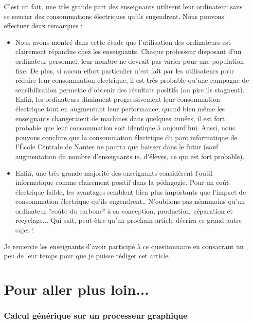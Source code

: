 \documentclass[a4paper,11pt,french]{article}
\begin{document}
C'est un fait, une très grande part des enseignants utilisent leur ordinateur sans se soucier des consommations électriques qu'ils engendrent. Nous pouvons effectuer deux remarques :\\
\begin{itemize}
\item Nous avons montré dans cette étude que l'utilisation des ordinateurs est clairement répandue chez les enseignants. Chaque professeur disposant d'un ordinateur personnel, leur nombre ne devrait pas varier pour une population fixe. De plus, si aucun effort particulier n'est fait par les utilisateurs pour réduire leur consommation électrique, il est très probable qu'une campagne de sensibilisation permette d'obtenir des résultats positifs (au pire ils stagnent). Enfin, les ordinateurs diminuent progressivement leur consommation électrique tout en augmentant leur performance; quand bien même les enseignants changeraient de machines dans quelques années, il est fort probable que leur consommation soit identique à aujourd'hui. Aussi, nous pouvons conclure que la consommation électrique du parc informatique de l'École Centrale de Nantes ne pourra que baisser dans le futur (sauf augmentation du nombre d'enseignants ie. d'élèves, ce qui est fort probable).
\item Enfin, une très grande majorité des enseignants considèrent l'outil informatique comme clairement positif dans la pédagogie. Pour un coût électrique faible, les avantages semblent bien plus importants que l'impact de consommation électrique qu'ils engendrent.. N'oublions pas néanmoins qu'un ordinateur "coûte du carbone" à sa conception, production, réparation et recyclage... Qui sait, peut-être qu'un prochain article décrira ce grand autre sujet !
\end{itemize}

Je remercie les enseignants d'avoir participé à ce questionnaire en consacrant un peu de leur temps pour que je puisse rédiger cet article.


\newpage
\part{Pour aller plus loin...}
\section{Calcul générique sur un processeur graphique}
\end{document}
